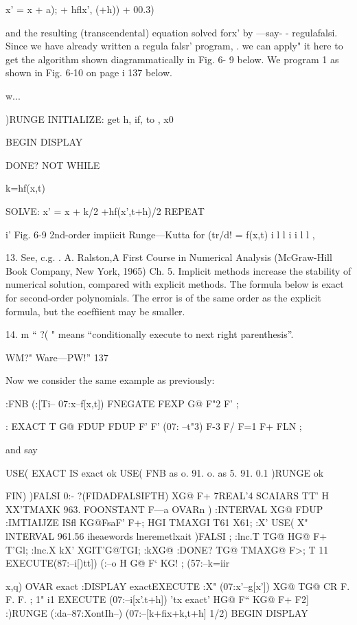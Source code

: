 {x’ = x + a); + hﬂx’, (+h)) + 00.3)

and the resulting (transcendental) equation solved forx’ by —say- -
regulafalsi. Since we have already written a regula falsr' program, .
we can apply" it here to get the algorithm shown diagrammatically
in Fig. 6- 9 below. We program 1 as shown in Fig. 6-10 on page i
137 below.

w...

 

 

)RUNGE
INITIALIZE: get h, if, to , x0

BEGIN DISPLAY

DONE? NOT
WHILE

k=hf(x,t)

SOLVE: x' = x + k/2 +hf(x’,t+h)/2
REPEAT

 

 

 

i’
Fig. 6-9 2nd-order impiicit Runge—Kutta for (tr/d! = f(x,t) i
l
l
i
i
l
l
,

 

13. See, c.g. . A. Ralston,A First Course in Numerical Analysis (McGraw-Hill Book Company, New
York, 1965) Ch. 5. Implicit methods increase the stability of numerical solution, compared with
explicit methods. The formula below is exact for second-order polynomials. The error is of the
same order as the explicit formula, but the eoefﬁient may be smaller.

14. m “ ?( " means “conditionally execute to next right parenthesis”.

WM?" Ware—PW!” 137

Now we consider the same example as previously:

:FNB (:[Ti-- 07:x--f[x,t])
FNEGATE FEXP G@ F"2 F' ;

: EXACT T G@ FDUP FDUP F' F' (07: --t"3)
F-3 F/ F=1 F+ FLN ;

and say

USE( EXACT IS exact ok
USE( FNB as o. 91. o. as 5. 91. 0.1 )RUNGE ok

 

FIN) )FALSI 0:- ?(FIDADFALSIFTH) XG@ F+
7REAL'4 SCAIARS TT' H XX'TMAXK 963. FOONSTANT F—a
OVARn \tohoidciaotiou) :INTERVAL XG@ FDUP
:IMTIAIJZE ISﬂ KG@FsaF' F+;
HGI TMAXGI T61 X61;
:X' USE( X" lNTERVAL 961.56
\‘iheaewords lneremetlxait )FALSI ;
:lnc.T TG@ HG@ F+ T'Gl; :lnc.X kX’ XGIT'G@TGI;
:kXG@ :DONE? TG@ TMAXG@ F>;
T 11 EXECUTE(87:--i[)tt]) (:--o
H G@ F‘ KG! ; (57:--k=iir{x,q) OVAR exact \cia
:DISPLAY exactEXECUTE
:X" (07:x'--g[x’]) XG@ TG@ CR F. F. F. ;
1" i1 EXECUTE (07:--i[x'.t+h]) \eml'tx exact'
HG@ F“ KG@ F+ F2] :)RUNGE (:da--87:XontIh--)
(07:--[k+ﬁx+k,t+h] 1/2) BEGIN DISPLAY

}}
